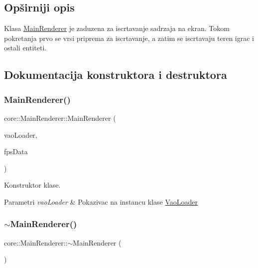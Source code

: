 \subsection{Opširniji opis}
Klasa \hyperlink{classcore_1_1MainRenderer}{Main\+Renderer} je zaduzena za iscrtavanje sadrzaja na ekran. Tokom pokretanja prvo se vrsi priprema za iscrtavanje, a zatim se iscrtavaju teren igrac i ostali entiteti. 

\subsection{Dokumentacija konstruktora i destruktora}
\mbox{\label{classcore_1_1MainRenderer_abe5c50d41cd58c1c89f290ffffae78dc}} 
\subsubsection{\texorpdfstring{Main\+Renderer()}{MainRenderer()}}
{\footnotesize\ttfamily core\+::\+Main\+Renderer\+::\+Main\+Renderer (\begin{DoxyParamCaption}\item[{\hyperlink{classcore_1_1VaoLoader}{Vao\+Loader} $\ast$}]{vao\+Loader,  }\item[{\hyperlink{classutility_1_1FpsData}{Fps\+Data} $\ast$}]{fps\+Data }\end{DoxyParamCaption})}



Konstruktor klase. 


\begin{DoxyParams}{Parametri}
{\em vao\+Loader} & Pokazivac na instancu klase \hyperlink{classcore_1_1VaoLoader}{Vao\+Loader} \\
\hline
\end{DoxyParams}
\mbox{\label{classcore_1_1MainRenderer_a1e5f39d2178a7c5738efa9be9bd486da}} 
\subsubsection{\texorpdfstring{$\sim$\+Main\+Renderer()}{~MainRenderer()}}
{\footnotesize\ttfamily core\+::\+Main\+Renderer\+::$\sim$\+Main\+Renderer (\begin{DoxyParamCaption}{ }\end{DoxyParamCaption})}



